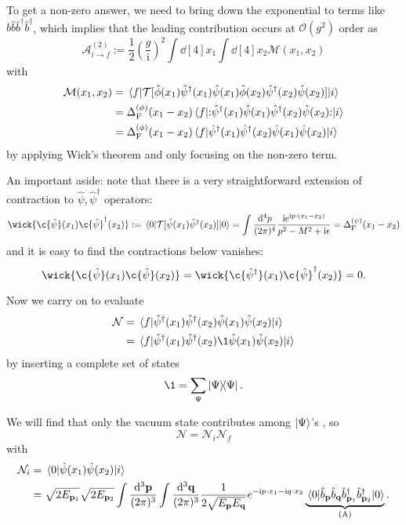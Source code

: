 \documentclass[a4paper,11pt]{article}
\begin{document}
	To get a non-zero answer, we need to bring down the exponential to terms like $\hat b \hat b \hat b^{\dagger} \hat b^{\dagger}$, which implies that the leading contribution occurs at $\mathcal{O}(g^2)$ order as 
	\[
		\mathcal{A}_{i \to f}^{(2)} := \frac{1}{2} \left( \frac{g}{\mathrm{i}} \right)^2 \int \dd[4]{x_1} \int \dd[4]{x_2} \mathcal{M}(x_1,x_2)
	\]
	with
	\begin{align*}
		\mathcal{M}(x_1,x_2) & = \mel{f}{\mathcal{T}[\hat \phi(x_1) \hat \psi^{\dagger}(x_1) \hat \psi(x_1)\hat \phi(x_2) \hat \psi^{\dagger}(x_2) \hat \psi(x_2)]}{i}\\
		& = \Delta_\text{F}^{(\phi)}(x_1 - x_2) \mel{f}{:\mathrel{\hat \psi^{\dagger}(x_1)\hat \psi(x_1)\hat \psi^{\dagger}(x_2)\hat \psi(x_2)}:}{i}\\
		& = \Delta_\text{F}^{(\phi)}(x_1 - x_2) \mel{f}{\hat \psi^{\dagger}(x_1) \hat \psi^{\dagger}(x_2) \hat \psi(x_1)\hat \psi(x_2)}{i}
	\end{align*}
	by applying Wick's theorem and only focusing on the non-zero term.

	An important aside: note that there is a very straightforward extension of contraction to $\hat \psi, \hat \psi^{\dagger}$ operators: 
	\[
		\wick{\c{\hat \psi}(x_1)\c{\hat \psi}^{\dagger}(x_2)}:= \mel{0}{\mathcal{T}[\hat \psi(x_1)\hat \psi^{\dagger}(x_2)]}{0} = \int \ddk{p}{4} \frac{\mathrm{i} e ^{\mathrm{i} p \cdot (x_1 - x_2)}}{p^2 - M^2 + \mathrm{i} \epsilon} = \Delta_\text{F}^{(\psi)}(x_1 - x_2)
	\]
	and it is easy to find the contractions below vanishes:
	\[
		\wick{\c{\hat \psi}(x_1)\c{\hat \psi}(x_2)} = \wick{\c{\hat \psi^{\dagger}}(x_1) \c{\hat \psi}^{\dagger}(x_2)} = 0.
	\]

	Now we carry on to evaluate
	\begin{align*}
		\mathcal{N} & = \mel{f}{\hat \psi^{\dagger}(x_1)\hat \psi^{\dagger}(x_2) \hat \psi(x_1) \hat \psi(x_2)}{i}\\
		& = \mel{f}{\hat \psi^{\dagger}(x_1)\hat \psi^{\dagger}(x_2) \1 \hat \psi(x_1) \hat \psi(x_2)}{i}
	\end{align*}
	by inserting a complete set of states
	\[
		\1 = \sum _{\Psi} \dyad{\Psi}{\Psi}.
	\]

	We will find that only the vacuum state contributes among $\ket{\Psi}$'s , so
	\[
		\mathcal{N} = \mathcal{N}_i \mathcal{N}_f
	\]
	with
	\begin{align*}
		\mathcal{N}_i & = \mel{0}{\hat \psi(x_1)\hat \psi(x_2)}{i}\\
		& = \sqrt{2 E _{\vb p_1}} \sqrt{2 E _{\vb p_2}} \int \frac{\dd[3]{\vb p}}{(2\pi)^{3}} \int \frac{\dd[3]{\vb q}}{(2\pi)^{3}} \frac{1}{2 \sqrt{E _{\vb p} E _{\vb q}}} e ^{-\mathrm{i} p \cdot x_1 - \mathrm{i} q \cdot x_2} \underbrace{\mel{0}{\hat b _{\vb p} \hat b _{\vb q} \hat b^{\dagger}_{\vb p_1}\hat b^{\dagger}_{\vb p_2}}{0}}_{\text{(A)}}.
	\end{align*}
\end{document}
